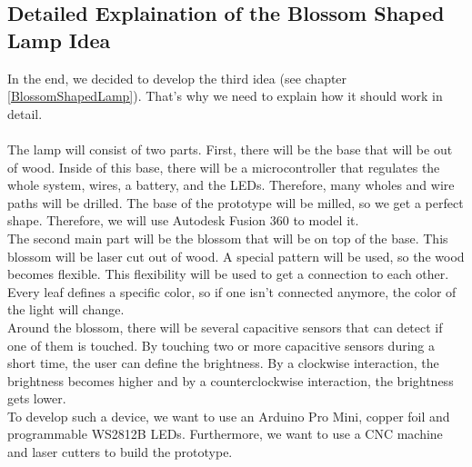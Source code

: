 \documentclass[04_projectProcess.tex]{subfiles}
\begin{document}
    \subsection{Detailed Explaination of the Blossom Shaped Lamp Idea}
        \begin{flushleft}
            In the end, we decided to develop the third idea (see chapter \ref{BlossomShapedLamp}). 
            That's why we need to explain how it should work in detail. \\~\\

            The lamp will consist of two parts. First, there will be the base that will be out of 
            wood. Inside of this base, there will be a microcontroller that regulates the whole 
            system, wires, a battery, and the LEDs. Therefore, many wholes and wire paths will be 
            drilled. The base of the prototype will be milled, so we get a perfect shape. Therefore, 
            we will use Autodesk Fusion 360\cite{autodeskFusion360} to model it.\\

            The second main part will be the blossom that will be on top of the base. This blossom
            will be laser cut out of wood. A special pattern will be used, so the wood becomes flexible.
            This flexibility will be used to get a connection to each other. Every leaf defines a 
            specific color, so if one isn't connected anymore, the color of the light will change. \\

            Around the blossom, there will be several capacitive sensors that can detect if one of them 
            is touched. By touching two or more capacitive sensors during a short time, the user can 
            define the brightness. By a clockwise interaction, the brightness becomes higher and 
            by a counterclockwise interaction, the brightness gets lower. \\

            To develop such a device, we want to use an Arduino Pro Mini, copper foil and programmable 
            WS2812B LEDs. Furthermore, we want to use a CNC machine and laser cutters to build the 
            prototype.
        \end{flushleft}
\end{document}
